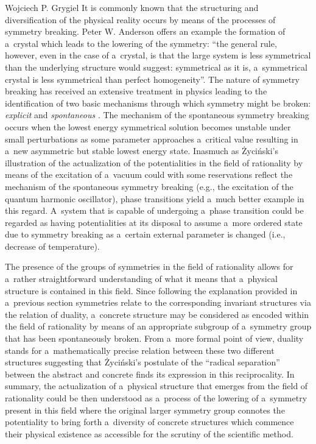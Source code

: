 \begin{artengenv}{Wojciech P. Grygiel}
It is commonly known that the structuring and diversification of the physical reality occurs by means of the processes of symmetry breaking. Peter W. Anderson 
\parencite*[][p.395]{anderson_more_1972} %
 offers an example the formation of a~crystal which leads to the lowering of the symmetry: ``the general rule, however, even in the case of a~crystal, is that the large system is less symmetrical than the underlying structure would suggest: symmetrical as it is, a~symmetrical crystal is less symmetrical than perfect homogeneity''. The nature of symmetry breaking has received an extensive treatment in physics leading to the identification of two basic mechanisms through which symmetry might be broken: \textit{explicit} and \textit{spontaneous} 
\parencite[e.g.,][]{brading_meaning_2003}. %
 The mechanism of the spontaneous symmetry breaking occurs when the lowest energy symmetrical solution becomes unstable under small perturbations as some parameter approaches a~critical value resulting in a~new asymmetric but stable lowest energy state. Inasmuch as Życiński's illustration of the actualization of the potentialities in the field of rationality by means of the excitation of a~vacuum could with some reservations reflect the mechanism of the spontaneous symmetry breaking (e.g., the excitation of the quantum harmonic oscillator), phase transitions yield a~much better example in this regard. A~system that is capable of undergoing a~phase transition could be regarded as having potentialities at its disposal to assume a~more ordered state due to symmetry breaking as a~certain external parameter is changed (i.e., decrease of temperature).



The presence of the groups of symmetries in the field of rationality allows for a~rather straightforward understanding of what it means that a~physical structure is contained in this field. Since following the explanation provided in a~previous section symmetries relate to the corresponding invariant structures via the relation of duality, a~concrete structure may be considered as encoded within the field of rationality by means of an appropriate subgroup of a~symmetry group that has been spontaneously broken. From a~more formal point of view, duality stands for a~mathematically precise relation between these two different structures suggesting that Życiński's postulate of the ``radical separation'' between the abstract and concrete finds its expression in this reciprocality. In summary, the actualization of a~physical structure that emerges from the field of rationality could be then understood as a~process of the lowering of a~symmetry present in this field where the original larger symmetry group connotes the potentiality to bring forth a~diversity of concrete structures which commence their physical existence as accessible for the scrutiny of the scientific method.




\end{artengenv}
